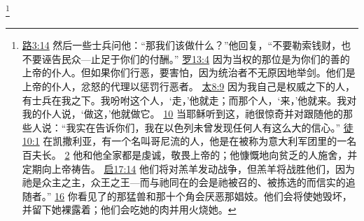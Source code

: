 \documentclass[12pt, a4paper, oneside]{ctexart}
\begin{document}
	\footnote {
		\href{https://biblehub.com/luke/3-14.htm}{路3:14} 然后一些士兵问他：“那我们该做什么？”他回复，“不要勒索钱财，也不要诬告民众---止足于你们的付酬。”
		\href{https://biblehub.com/romans/13-4.htm}{罗13:4} 因为当权的那位是为你们的善的上帝的仆人。但如果你们行恶，要害怕，因为统治者不无原因地举剑。他们是上帝的仆人，忿怒的代理以惩罚行恶者。
		\href{https://biblehub.com/matthew/8-9.htm}{太8:9} 因为我自己是权威之下的人，有士兵在我之下。我吩咐这个人，‘走，’他就走；而那个人，‘来，’他就来。我对我的仆人说，‘做这，’他就做它。
		\href{https://biblehub.com/matthew/8-10.htm}{10} 当耶稣听到这，祂很惊奇并对跟随他的那些人说：“我实在告诉你们，我在以色列未曾发现任何人有这么大的信心。”
		\href{https://biblehub.com/acts/10-1.htm}{徒10:1} 在凯撒利亚，有一个名叫哥尼流的人，他是在被称为意大利军团里的一名百夫长。
		\href{https://biblehub.com/acts/10-2.htm}{2} 他和他全家都是虔诚，敬畏上帝的；他慷慨地向贫乏的人施舍，并定期向上帝祷告。
		\href{https://biblehub.com/revelation/17-14.htm}{启17:14} 他们将对羔羊发动战争，但羔羊将战胜他们，因为祂是众主之主，众王之王---而与祂同在的会是祂被召的、被拣选的而信实的追随者。”
		\href{https://biblehub.com/revelation/17-16.htm}{16} 你看见了的那猛兽和那十个角会厌恶那娼妓。他们会将使她毁坏，并留下她裸露着；他们会吃她的肉并用火烧她。
	}
\end{document}

